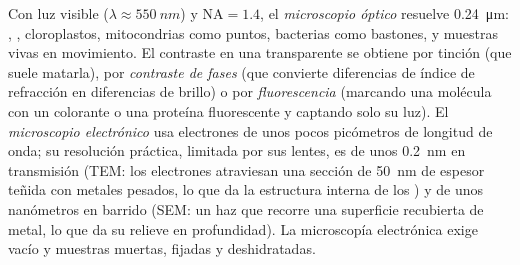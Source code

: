 \begin{proposition}\label{prop:b1:cell-unit-of-life:microscopes}
Con luz visible ($\lambda \approx \qty{550}{nm}$) y $\mathrm{NA} = 1.4$, el
\emph{microscopio óptico} resuelve
\qty{0.24}{\micro m}: , , cloroplastos, mitocondrias como
puntos, bacterias como bastones, y muestras vivas en movimiento. El
contraste en una  transparente se obtiene por tinción (que suele
matarla), por \emph{contraste de fases} (que convierte diferencias de índice
de refracción en diferencias de brillo) o por \emph{fluorescencia} (marcando
una molécula con un colorante o una proteína fluorescente y captando solo su
luz). El \emph{microscopio electrónico} usa
electrones de unos pocos picómetros de longitud de onda; su resolución
práctica, limitada por sus lentes, es de unos \qty{0.2}{nm} en transmisión
(TEM: los electrones atraviesan una sección de \qty{50}{nm} de espesor
teñida con metales pesados, lo que da la estructura interna de los
) y de unos nanómetros en barrido (SEM: un haz que recorre una
superficie recubierta de metal, lo que da su relieve en profundidad). La
microscopía electrónica exige vacío y muestras muertas, fijadas y
deshidratadas.
\end{proposition}

